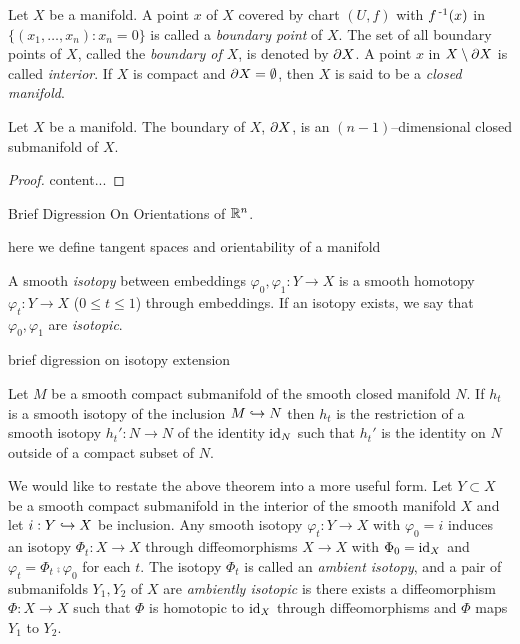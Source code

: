 \begin{defn}	
	\label{def:boundary}
	Let $X$ be a manifold.
	A point $x$ of $X$ covered by chart $(U,f)$ with $f^{\,\text{-}1}(x)$ in $\{(x_1,\dots,x_n): x_n = 0\}$ is called a \emph{boundary point} of $X$.
	The set of all boundary points of $X$, called the \emph{boundary of $X$}, is denoted by $\partial X$.
	A point $x$ in $X\setminus \partial X$ is called \emph{interior}.
	If $X$ is compact and $\partial X=\emptyset$, then $X$ is said to be a \emph{closed manifold}.
\end{defn}

\begin{prop}
	\label{prop:boundariesaremanifolds}
	Let $X$ be a manifold.
	The boundary of $X$, $\partial X$, is an $(n-1)$--dimensional closed submanifold of $X$.
\end{prop}

\begin{proof}
	content...
\end{proof}

Brief Digression On Orientations of $\mathbb{R}^n$.

\begin{defn}
	\label{def:orient}
	
	here we define tangent spaces and orientability of a manifold
	
\end{defn}

\begin{defn}
	\label{def:isotopy}
	
	A smooth \emph{isotopy} between embeddings $\varphi_0,\varphi_1:Y\to X$ is a smooth homotopy $\varphi_t: Y \to X$ ($0\leq t\leq 1$) through embeddings.
	If an isotopy exists, we say that $\varphi_0,\varphi_1$ are \emph{isotopic}.
	
\end{defn}

brief digression on isotopy extension

\begin{theorem}
	\label{thm:isotopyextension}
	
	Let $M$ be a smooth compact submanifold of the smooth closed manifold $N$.
	If $h_t$ is a smooth isotopy of the inclusion $M\hookrightarrow N$ then $h_t$ is the restriction of a smooth isotopy $h_t':N\to N$ of the identity $\textrm{id}_{N}$ such that $h_t'$ is the identity on $N$ outside of a compact subset of $N$.
	
\end{theorem}

We would like to restate the above theorem into a more useful form.
Let $Y\subset X$ be a smooth compact submanifold in the interior of the smooth manifold $X$ and let $i:Y\hookrightarrow X$ be inclusion.
Any smooth isotopy $\varphi_t:Y\to X$ with $\varphi_0=i$ induces an isotopy $\Phi_t:X\to X$ through diffeomorphisms $X\to X$ with $\Phi_0=\textrm{id}_{X}$ and $\varphi_t=\Phi_t\comp\varphi_0$ for each $t$.
The isotopy $\Phi_t$ is called an \emph{ambient isotopy}, and a pair of submanifolds $Y_1,Y_2$ of $X$ are \emph{ambiently isotopic} is there exists a diffeomorphism $\Phi:X\to X$ such that $\Phi$ is homotopic to $\textrm{id}_{X}$ through diffeomorphisms and $\Phi$ maps $Y_1$ to $Y_2$.

